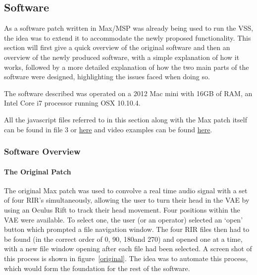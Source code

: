 \documentclass[../../main.tex]{subfiles}
\begin{document}
\lstset{language=Java} 
	\subsection{Software}
	\label{software}
		
		As a software patch written in Max/MSP was already being used to run the \ac{VSS}, the idea was to extend it to accommodate the newly proposed functionality. This section will first give a quick overview of the original software and then an overview of the newly produced software, with a simple explanation of how it works, followed by a more detailed explanation of how the two main parts of the software were designed, highlighting the issues faced when doing so.

		The software described was operated on a 2012 Mac mini with 16GB of RAM, an Intel Core i7 processor running OSX 10.10.4.

		All the javascript files referred to in this section along with the Max patch itself can be found in file 3 or \href{http://lt669.github.io/pages/javascripts.html}{here} and video examples can be found \href{http://lt669.github.io/pages/videos.html}{here}.

		\subsubsection{Software Overview}

			\paragraph{The Original Patch}
			\label{softwareoverview:original}
				The original Max patch was used to convolve a real time audio signal with a set of four \ac{RIR}'s simultaneously, allowing the user to turn their head in the \ac{VAE} by using an Oculus Rift to track their head movement. Four positions within the \ac{VAE} were available. To select one, the user (or an operator) selected an `open' button which prompted a file navigation window. The four \ac{RIR} files then had to be found (in the correct order of 0\textdegree, 90\textdegree, 180\textdegree and 270\textdegree) and opened one at a time, with a new file window opening after each file had been selected. A screen shot of this process is shown in figure~\ref{original}. The idea was to automate this process, which would form the foundation for the rest of the software.
\end{document}
